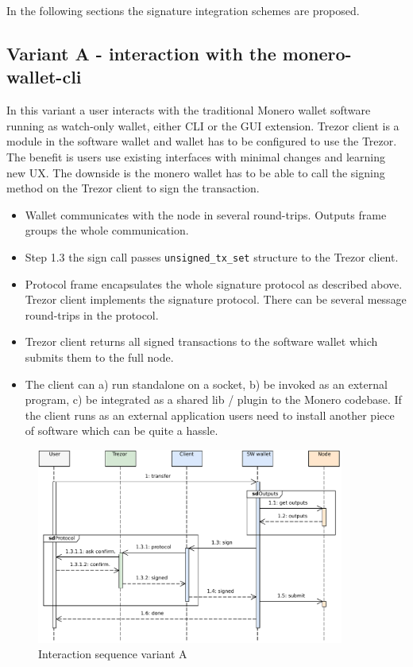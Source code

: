 \documentclass[]{article}
\begin{document}
In the following sections the signature integration schemes are proposed.

\subsection{Variant A - interaction with the monero-wallet-cli}
In this variant a user interacts with the traditional Monero wallet software running as watch-only wallet, either CLI or the GUI extension. Trezor client is a module in the software wallet and wallet has to be configured to use the Trezor. 
The benefit is users use existing interfaces with minimal changes and learning new UX.
The downside is the monero wallet has to be able to call the signing method on the Trezor client to sign the transaction.

\begin{itemize}
	\item Wallet communicates with the node in several round-trips. Outputs frame groups the whole communication.
	\item Step 1.3 the sign call passes \verb|unsigned_tx_set| structure to the Trezor client. 
	\item Protocol frame encapsulates the whole signature protocol as described above. Trezor client implements the signature protocol. There can be several message round-trips in the protocol.
	\item Trezor client returns all signed transactions to the software wallet which submits them to the full node.
	\item The client can a) run standalone on a socket, b) be invoked as an external program, c) be integrated as a shared lib / plugin to the Monero codebase. If the client runs as an external application users need to install another piece of software which can be quite a hassle.
\end{itemize}
 
\begin{figure}[H]
	\centering
	\includegraphics[width=0.9\textwidth, angle=0]{img/variantA.pdf}
	\caption{Interaction sequence variant A}
\end{figure}
\end{document}
